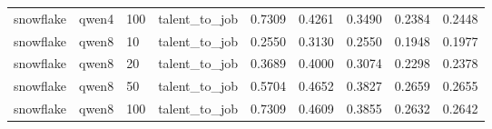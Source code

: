 \begin{table}[t]
\begin{tabular}{lllllllll}
snowflake & qwen4 & 100 & talent_to_job & 0.7309 & 0.4261 & 0.3490 & 0.2384 & 0.2448 \\
snowflake & qwen8 & 10 & talent_to_job & 0.2550 & 0.3130 & 0.2550 & 0.1948 & 0.1977 \\
snowflake & qwen8 & 20 & talent_to_job & 0.3689 & 0.4000 & 0.3074 & 0.2298 & 0.2378 \\
snowflake & qwen8 & 50 & talent_to_job & 0.5704 & 0.4652 & 0.3827 & 0.2659 & 0.2655 \\
snowflake & qwen8 & 100 & talent_to_job & 0.7309 & 0.4609 & 0.3855 & 0.2632 & 0.2642 \\
\bottomrule
\end{tabular}
\end{table}
